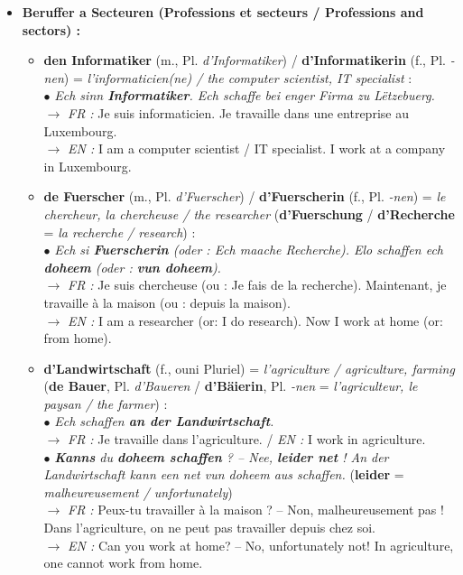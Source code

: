 \begin{itemize}
    \item \textbf{Beruffer a Secteuren (Professions et secteurs / Professions and sectors) :}
    \begin{itemize}
        \item \textbf{den Informatiker} (m., Pl. \textit{d'Informatiker}) / \textbf{d'Informatikerin} (f., Pl. \textit{-nen}) = \textit{l'informaticien(ne) / the computer scientist, IT specialist} : \\
        $\bullet$ \textit{Ech sinn \textbf{Informatiker}. Ech schaffe bei enger Firma zu Lëtzebuerg.} \\
        $\rightarrow$ \textit{FR :} Je suis informaticien. Je travaille dans une entreprise au Luxembourg. \\
        $\rightarrow$ \textit{EN :} I am a computer scientist / IT specialist. I work at a company in Luxembourg.
        \item \textbf{de Fuerscher} (m., Pl. \textit{d'Fuerscher}) / \textbf{d'Fuerscherin} (f., Pl. \textit{-nen}) = \textit{le chercheur, la chercheuse / the researcher} (\textbf{d'Fuerschung} / \textbf{d'Recherche} = \textit{la recherche / research}) : \\
        $\bullet$ \textit{Ech si \textbf{Fuerscherin} (oder : Ech maache Recherche). Elo schaffen ech \textbf{doheem} (oder : \textbf{vun doheem}).} \\
        $\rightarrow$ \textit{FR :} Je suis chercheuse (ou : Je fais de la recherche). Maintenant, je travaille à la maison (ou : depuis la maison). \\
        $\rightarrow$ \textit{EN :} I am a researcher (or: I do research). Now I work at home (or: from home).
        \item \textbf{d'Landwirtschaft} (f., ouni Pluriel) = \textit{l'agriculture / agriculture, farming} (\textbf{de Bauer}, Pl. \textit{d'Baueren} / \textbf{d'Bäierin}, Pl. \textit{-nen} = \textit{l'agriculteur, le paysan / the farmer}) : \\
        $\bullet$ \textit{Ech schaffen \textbf{an der Landwirtschaft}.} \\
        $\rightarrow$ \textit{FR :} Je travaille dans l'agriculture. / \textit{EN :} I work in agriculture. \\
        $\bullet$ \textit{\textbf{Kanns} du \textbf{doheem schaffen} ? -- Nee, \textbf{leider net} ! An der Landwirtschaft kann een net vun doheem aus schaffen.} (\textbf{leider} = \textit{malheureusement / unfortunately}) \\
        $\rightarrow$ \textit{FR :} Peux-tu travailler à la maison ? -- Non, malheureusement pas ! Dans l'agriculture, on ne peut pas travailler depuis chez soi. \\
        $\rightarrow$ \textit{EN :} Can you work at home? -- No, unfortunately not! In agriculture, one cannot work from home.
    \end{itemize}


\end{itemize}
